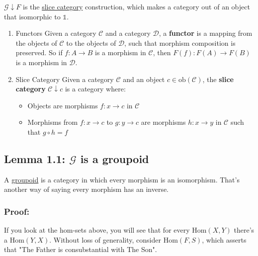 \documentclass[11pt]{article}
\begin{document}
\(\mathcal{G}\downarrow F\) is the \hyperref[sec:org31eacc6]{slice category} construction,
which makes a category out of an object that isomorphic to \(\mathbb{1}\).
\begin{enumerate}
\item Functors
\label{sec:org5f61f9d}
Given a category \(\mathcal{C}\) and a category \(\mathcal{D}\), a \textbf{\textbf{functor}} is a mapping from the objects of \(\mathcal{C}\) to the objects of \(\mathcal{D}\), such that morphism composition is preserved. So if \(f : A \to B\) is a morphism in \(\mathcal{C}\), then \(F(f) : F(A) \to F(B)\) is a morphism in \(\mathcal{D}\).
\item Slice Category
\label{sec:org31eacc6}
Given a category \(\mathcal{C}\) and an object \(c \in \text{ob}(\mathcal{C})\), the \textbf{\textbf{slice category}} \(\mathcal{C}\downarrow c\) is a category where:
\begin{itemize}
\item Objects are morphisms \(f : x \to c\) in \(\mathcal{C}\)
\item Morphisms from \(f : x \to c\) to \(g : y \to c\) are morphisms \(h : x \to y\) in \(\mathcal{C}\) such that \(g \circ h = f\)
\end{itemize}
\end{enumerate}
\subsection{Lemma 1.1: \(\mathcal{G}\) is a groupoid}
\label{sec:org2f57b60}

A \href{https://math.jhu.edu/\~eriehl/context.pdf\#page=25}{groupoid} is a category in which every morphism is an isomorphism. That's another way of saying every morphism has an inverse.
\subsubsection{Proof:}
\label{sec:org9072856}
If you look at the hom-sets above, you will see that for every \(\text{Hom}(X,Y)\) there's a \(\text{Hom}(Y,X)\).
Without loss of generality, consider \(\text{Hom}(F,S)\), which asserts that "The Father is consubstantial with The Son". 
\end{document}
